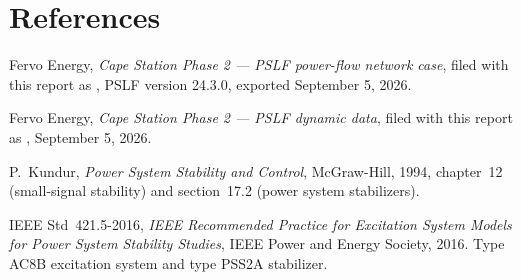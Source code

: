 \section{References}
\label{sec:refs}
\begin{enumerate}[label={[\arabic*]}]
  \item Fervo Energy, \emph{Cape Station Phase 2 --- PSLF power-flow network case},
        filed with this report as ,
        PSLF version 24.3.0, exported September 5, 2026.
  \item Fervo Energy, \emph{Cape Station Phase 2 --- PSLF dynamic data},
        filed with this report as ,
        September 5, 2026.
  \item P.~Kundur, \emph{Power System Stability and Control}, McGraw-Hill, 1994,
        chapter~12 (small-signal stability) and section~17.2 (power system
        stabilizers).
  \item IEEE Std~421.5-2016, \emph{IEEE Recommended Practice for Excitation System
        Models for Power System Stability Studies}, IEEE Power and Energy Society,
        2016. Type AC8B excitation system and type PSS2A stabilizer.
\end{enumerate}
